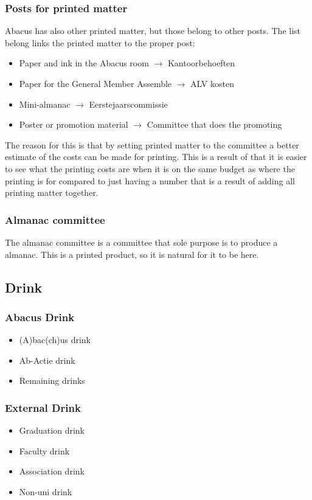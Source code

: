 \documentclass{report}
\begin{document}
\subsubsection{Posts for printed matter}
Abacus has also other printed matter, but those belong to other posts. The list belong links the printed matter to the proper post:
\begin{itemize}
\item Paper and ink in the Abacus room 		$\rightarrow$ Kantoorbehoeften
\item Paper for the General Member Assemble $\rightarrow$ ALV kosten
\item Mini-almanac $\rightarrow$ Eerstejaarscommissie
\item Poster or promotion material $\rightarrow$ Committee that does the promoting
\end{itemize}
The reason for this is that by setting printed matter to the committee a better estimate of the costs can be made for printing. This is a result of that it is easier to see what the printing costs are when it is on the same budget as where the printing is for compared to just having a number that is a result of adding all printing matter together.
\subsubsection{Almanac committee}
The almanac committee is a committee that sole purpose is to produce a almanac. This is a printed product, so it is natural for it to be here.

\subsection{Drink}
\subsubsection{Abacus Drink}
\begin{itemize}
\item (A)bac(ch)us drink
\item Ab-Actie drink
\item Remaining drinks
\end{itemize}
\subsubsection{External Drink}
\begin{itemize}
\item Graduation drink
\item Faculty drink
\item Association drink
\item Non-uni drink
\end{itemize}
\end{document}
